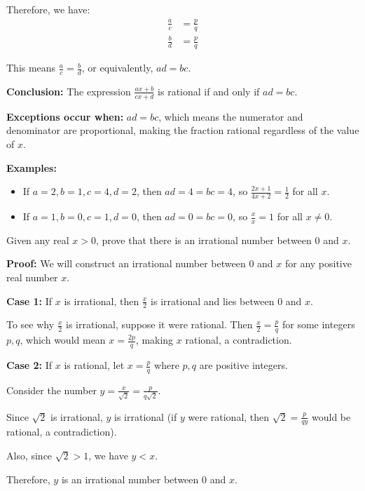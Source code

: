 Therefore, we have:
\begin{align*}
\frac{a}{c} &= \frac{p}{q} \\
\frac{b}{d} &= \frac{p}{q}
\end{align*}

This means $\frac{a}{c} = \frac{b}{d}$, or equivalently, $ad = bc$.

\textbf{Conclusion:}
The expression $\frac{ax + b}{cx + d}$ is rational if and only if $ad = bc$.

\textbf{Exceptions occur when:}
$ad = bc$, which means the numerator and denominator are proportional, making the fraction rational regardless of the value of $x$.

\textbf{Examples:}
\begin{itemize}
\item If $a = 2, b = 1, c = 4, d = 2$, then $ad = 4 = bc = 4$, so $\frac{2x + 1}{4x + 2} = \frac{1}{2}$ for all $x$.
\item If $a = 1, b = 0, c = 1, d = 0$, then $ad = 0 = bc = 0$, so $\frac{x}{x} = 1$ for all $x \neq 0$.
\end{itemize}

\begin{problembox}
Given any real $x > 0$, prove that there is an irrational number between $0$ and $x$.
\end{problembox}

\textbf{Proof:}
We will construct an irrational number between $0$ and $x$ for any positive real number $x$.

\textbf{Case 1:} If $x$ is irrational, then $\frac{x}{2}$ is irrational and lies between $0$ and $x$.

To see why $\frac{x}{2}$ is irrational, suppose it were rational. Then $\frac{x}{2} = \frac{p}{q}$ for some integers $p, q$, which would mean $x = \frac{2p}{q}$, making $x$ rational, a contradiction.

\textbf{Case 2:} If $x$ is rational, let $x = \frac{p}{q}$ where $p, q$ are positive integers.

Consider the number $y = \frac{x}{\sqrt{2}} = \frac{p}{q\sqrt{2}}$.

Since $\sqrt{2}$ is irrational, $y$ is irrational (if $y$ were rational, then $\sqrt{2} = \frac{p}{qy}$ would be rational, a contradiction).

Also, since $\sqrt{2} > 1$, we have $y < x$.

Therefore, $y$ is an irrational number between $0$ and $x$.

